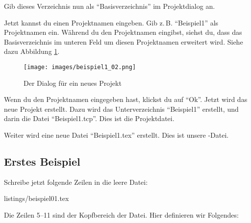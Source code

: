 Gib dieses Verzeichnis nun als \enquote{Basisverzeichnis} im Projektdialog an.

Jetzt kannst du einen Projektnamen eingeben. Gib z.\,B. \enquote{Beispiel1} als Projektnamen ein. Während du den Projektnamen eingibst, siehst du, dass das Basisverzeichnis im unteren Feld um diesen Projektnamen erweitert wird. Siehe dazu Abbildung \ref{fig:beispiel1_02}.

\begin{figure}[ht]
	\begin{center}
		\texttt{[image: images/beispiel1\_02.png]}
	\end{center}
	\caption{Der Dialog für ein neues Projekt}
	\label{fig:beispiel1_02}
\end{figure}

Wenn du den Projektnamen eingegeben hast, klickst du auf \enquote{Ok}. Jetzt wird das neue Projekt erstellt. Dazu wird das Unterverzeichnis \enquote{Beispiel1} erstellt, und darin die Datei \enquote{Beispiel1.tcp}. Dies ist die Projektdatei.

Weiter wird eine neue Datei \enquote{Beispiel1.tex} erstellt. Dies ist unsere \DMLLaTeX-Datei.

\subsection{Erstes Beispiel}
\label{sec:erstesbeispiel}

Schreibe jetzt folgende Zeilen in die leere Datei:

%
	{listings/beispiel01.tex}

Die Zeilen 5--11 sind der Kopfbereich der Datei. Hier definieren wir Folgendes:

